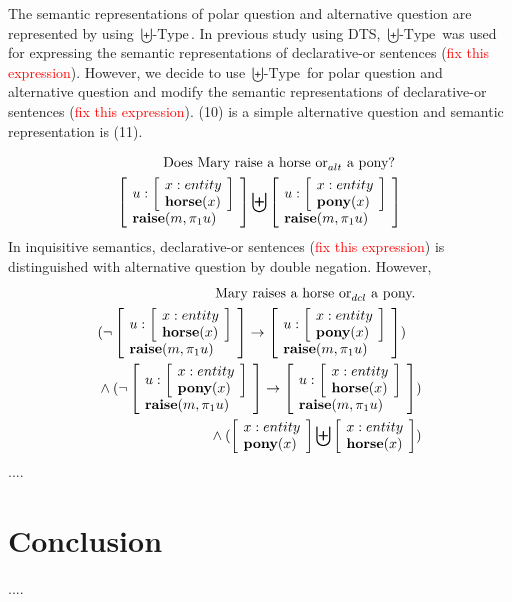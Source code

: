 \documentclass[a4paper,11pt, leqno]{article}
\begin{document}
The semantic representations of polar question and alternative question are represented by using $\biguplus\mbox{-Type}$. In previous study using DTS, $\biguplus\mbox{-Type}$ was used for expressing the semantic representations of declarative-or sentences (\textcolor{red}{fix this expression}). However, we decide to use $\biguplus\mbox{-Type}$ for  polar question and alternative question and modify the semantic representations of declarative-or sentences (\textcolor{red}{fix this expression}). (10) is a simple alternative question and semantic representation is (11). \par
\begin{align}
\mbox{Does Mary raise a horse or}_{alt}\mbox{  a pony? }\\
\dOr{\dSigma[u]{\dSigma[x]{entity}{\pred{horse}(x)}}{\pred{raise}(m, \pi_1 u)}}{\dSigma[u]{\dSigma[x]{entity}{\pred{pony}(x)}}{\pred{raise}(m, \pi_1 u)}}
\end{align}
In inquisitive semantics, declarative-or sentences (\textcolor{red}{fix this expression}) is distinguished with alternative question by double negation. However, 
\begin{align}
\mbox{Mary raises a horse or}_{dcl}\mbox{  a pony. }\\
\begin{multlined}[t]
(\lnot \dSigma[u]{\dSigma[x]{entity}{\pred{horse}(x)}}{\pred{raise}(m, \pi_1 u)} \rightarrow \dSigma[u]{\dSigma[x]{entity}{\pred{pony}(x)}}{\pred{raise}(m, \pi_1 u)})\\
\land(\lnot \dSigma[u]{\dSigma[x]{entity}{\pred{pony}(x)}}{\pred{raise}(m, \pi_1 u)} \rightarrow \dSigma[u]{\dSigma[x]{entity}{\pred{horse}(x)}}{\pred{raise}(m, \pi_1 u)})\\
\land(\dOr{ \dSigma[x]{entity}{\pred{pony}(x)}}{ \dSigma[x]{entity}{\pred{horse}(x)}})
\end{multlined}
\end{align}
....
\section{Conclusion}
....



\end{document}
